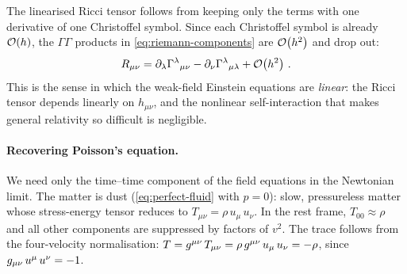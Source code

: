 The linearised Ricci tensor follows from keeping only the terms with
one derivative of one Christoffel symbol.  Since each Christoffel
symbol is already $\mathcal{O}\!\left(h\right)$, the $\Gamma\Gamma$ products
in \cref{eq:riemann-components} are $\mathcal{O}\!\left(h^2\right)$ and drop out:
%
\begin{equation}
  R_{\mu\nu}
    = \partial_{\lambda}\Gamma^{\lambda}{}_{\mu \nu}
    - \partial_{\nu}\Gamma^{\lambda}{}_{\mu \lambda}
    + \mathcal{O}\!\left(h^2\right) \,.
  \label{eq:ricci-linearised}
\end{equation}
%
This is the sense in which the weak-field Einstein equations are
\emph{linear}: the Ricci tensor depends linearly on $h_{\mu\nu}$,
and the nonlinear self-interaction that makes general relativity so
difficult is negligible.

\paragraph{Recovering Poisson's equation.}

We need only the time--time component of the field equations in the
Newtonian limit.  The matter is dust (\cref{eq:perfect-fluid} with
$p = 0$): slow, pressureless matter whose stress-energy tensor reduces
to $T_{\mu\nu} = \rho\,u_\mu\,u_\nu$.  In the rest frame,
$T_{00} \approx \rho$ and all other components are suppressed by
factors of $v^2$.  The trace follows from
the four-velocity normalisation:
$T = g^{\mu\nu}\,T_{\mu\nu}
= \rho\,g^{\mu\nu}\,u_\mu\,u_\nu = -\rho$,
since $g_{\mu\nu}\,u^\mu\,u^\nu = -1$.

